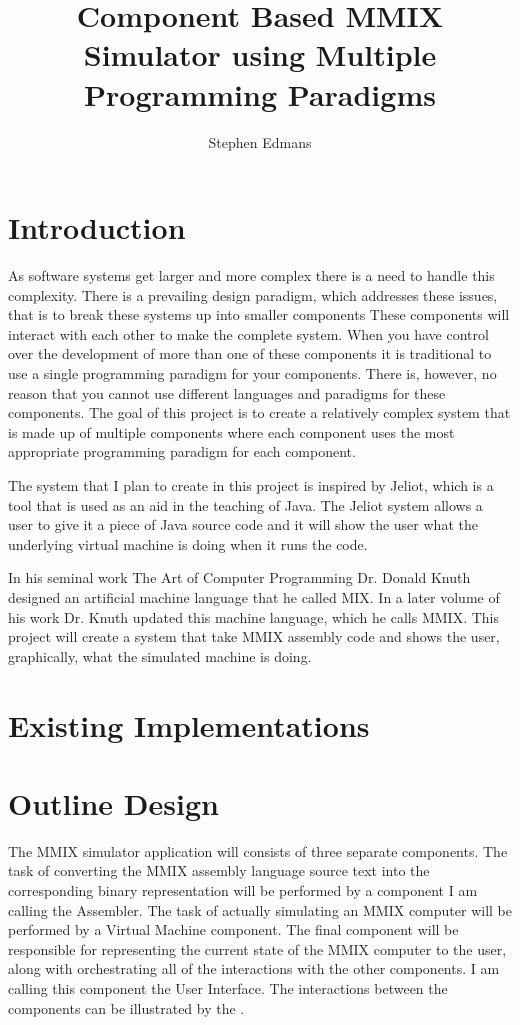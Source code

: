 \documentclass[11pt]{article} %
\title{Component Based MMIX Simulator using Multiple Programming Paradigms}
\author{Stephen Edmans}
\date{} %
\begin{document}
\maketitle
\newpage
\tableofcontents
\newpage
\listoffigures
\newpage
\section{Introduction}
As software systems get larger and more complex there is a need to handle this complexity. There is a prevailing design paradigm, which addresses these issues, that is to break these systems up into smaller components %
These components will interact with each other to make the complete system. When you have control over the development of more than one of these components it is traditional to use a single programming paradigm for your components. There is, however, no reason that you cannot use different languages and paradigms for these components. The goal of this project is to create a relatively complex system that is made up of multiple components where each component uses the most appropriate programming paradigm for each component.

The system that I plan to create in this project is inspired by Jeliot, which is a tool that is used as an aid in the teaching of Java. %
The Jeliot system allows a user to give it a piece of Java source code and it will show the user what the underlying virtual machine is doing when it runs the code.

In his seminal work The Art of Computer Programming Dr. Donald Knuth designed an artificial machine language that he called MIX. In a later volume of his work Dr. Knuth updated this machine language, which he calls MMIX. This project will create a system that take MMIX assembly code and shows the user, graphically, what the simulated machine is doing.


\section{Existing Implementations}


\section{Outline Design}
The MMIX simulator application will consists of three separate components. The task of converting the MMIX assembly language source text into the corresponding binary representation will be performed by a component I am calling the Assembler. The task of actually simulating an MMIX computer will be performed by a Virtual Machine component. The final component will be responsible for representing the current state of the MMIX computer to the user, along with orchestrating all of the interactions with the other components. I am calling this component the User Interface.  The interactions between the components can be illustrated by the .
\end{document}
